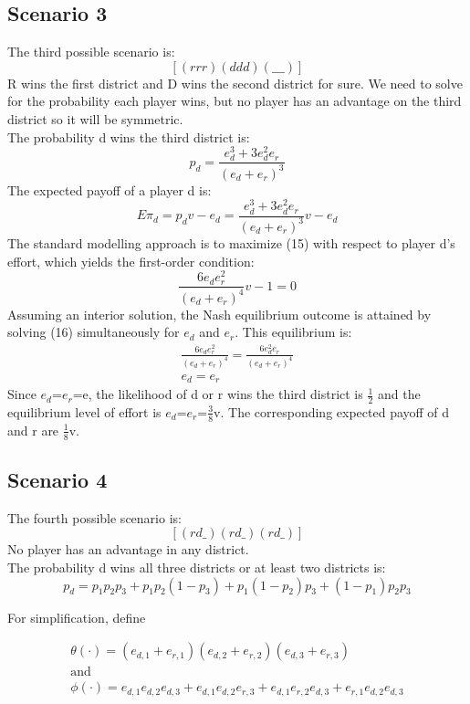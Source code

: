 \documentclass[a4paper,12pt]{article}
\begin{document}
\subsection{Scenario 3}
The third possible scenario is: $$[(rrr)(ddd)(\_\_\_)]$$
R wins the first district and D wins the second district for sure. We need to solve for the probability each player wins, but no player has an advantage on the third district so it will be symmetric.
\\The probability d wins the third district is: 
\begin{equation}
p_d = \frac{e_d^3+3e_d^2e_r}{(e_d+e_r)^3}
\end{equation}
The expected payoff of a player d is:
\begin{equation}
E\pi_d = p_dv-e_d= \frac{e_d^3+3e_d^2e_r}{(e_d+e_r)^3}v-e_d
\end{equation}
The standard modelling approach is to maximize (15) with respect to player d's effort, which yields the first-order condition: 
\begin{equation}
\frac{6e_de_r^2}{(e_d+e_r)^4}v-1=0
\end{equation}
Assuming an interior solution, the Nash equilibrium outcome is attained by solving (16) simultaneously for $e_d$ and $e_r$. This equilibrium is: 
\begin{eqnarray} 
\frac{6e_de_r^2}{(e_d+e_r)^4} = \frac{6e_d^2e_r}{(e_d+e_r)^4} \\
e_d=e_r
\end{eqnarray}
Since $e_d$=$e_r$=e, the likelihood of d or r wins the third district is $\frac{1}{2}$ and the equilibrium level of effort is $e_d$=$e_r$=$\frac{3}{8}$v.
The corresponding expected payoff of d and r are $\frac{1}{8}$v. 

\subsection{Scenario 4}
The fourth possible scenario is: $$[(rd\_)(rd\_)(rd\_)]$$
No player has an advantage in any district.
\\The probability d wins all three districts or at least two districts is: 
\begin{equation}
p_d = p_1p_2p_3+p_1p_2(1-p_3)+p_1(1-p_2)p_3+(1-p_1)p_2p_3
\end{equation}

\noindent For simplification, define 

\begin{gather*} 
\theta(\cdot) =  (e_{d,1}+e_{r,1})(e_{d,2}+e_{r,2})(e_{d,3}+e_{r,3}) \\ \text{and} \\
\phi(\cdot) = e_{d,1}e_{d,2}e_{d,3} + e_{d,1}e_{d,2}e_{r,3} + e_{d,1}e_{r,2}e_{d,3} + e_{r,1}e_{d,2}e_{d,3}
\end{gather*}
\end{document}
